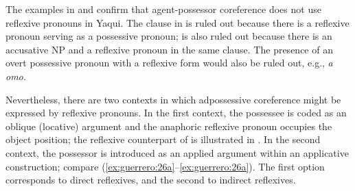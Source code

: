 \documentclass[output=paper]{langscibook}
\begin{document}



\z
\z



The examples in  and  confirm that agent-possessor coreference does not use reflexive pronouns in Yaqui. The clause in  is ruled out because there is a reflexive pronoun serving as a possessive pronoun;  is also ruled out because there is an accusative NP and a reflexive pronoun in the same clause. The presence of an overt possessive pronoun with a reflexive form would also be ruled out, e.g., \textit{a omo.}



\ea%
    \label{ex:guerrero:25}


\z
\z



Nevertheless, there are two contexts in which adpossessive coreference might be expressed by reflexive pronouns. In the first context, the possessee is coded as an oblique (locative) argument and the anaphoric reflexive pronoun occupies the object position; the reflexive counterpart of  is illustrated in . In the second context, the possessor is introduced as an applied argument within an applicative construction; compare (\ref{ex:guerrero:26a}--\ref{ex:guerrero:26a}). The first option corresponds to direct reflexives, and the second to indirect reflexives.
\end{document}
